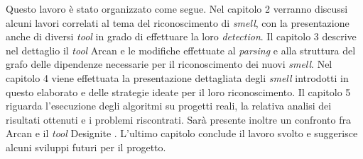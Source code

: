 
    Questo lavoro è stato organizzato come segue.
    Nel capitolo 2 verranno discussi alcuni lavori correlati al tema del riconoscimento di \textit{smell}, con la presentazione anche di diversi \textit{tool} in grado di effettuare la loro \textit{detection}. 
    Il capitolo 3 descrive nel dettaglio il \textit{tool} Arcan \cite{Arcan2017} e le modifiche effettuate al \textit{parsing} e alla struttura del grafo delle dipendenze necessarie per il riconoscimento dei nuovi \textit{smell}. Nel capitolo 4 viene effettuata la presentazione dettagliata degli \textit{smell} introdotti in questo elaborato e delle strategie ideate per il loro riconoscimento.
    Il capitolo 5 riguarda l'esecuzione degli algoritmi su progetti reali, la relativa analisi dei risultati ottenuti e i problemi riscontrati. Sarà presente inoltre un confronto fra Arcan e il \textit{tool} Designite \cite{Designite}.
    L'ultimo capitolo conclude il lavoro svolto e suggerisce alcuni sviluppi futuri per il progetto.
    

    


